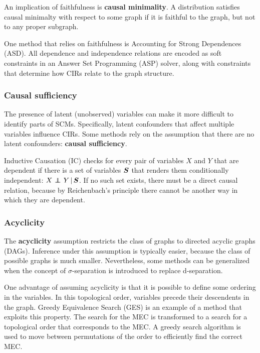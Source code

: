
An implication of faithfulness is \textbf{causal minimality}. A distribution satisfies causal minimalty with respect to some graph if it is faithful to the graph, but not to any proper subgraph. 

One method that relies on faithfulness is Accounting for Strong Dependences (ASD). All dependence and independence relations are encoded as soft constraints in an Answer Set Programming (ASP) solver, along with constraints that determine how CIRs relate to the graph structure.

\subsubsection{Causal sufficiency}

The presence of latent (unobserved) variables can make it more difficult to identify parts of SCMs. Specifically, latent confounders that affect multiple variables influence CIRs. Some methods rely on the assumption that there are no latent confounders: \textbf{causal sufficiency}.

Inductive Causation (IC) checks for every pair of variables $X$ and $Y$ that are dependent if there is a set of variables $\bm{S}$ that renders them conditionally independent: ${X} \operatorname*{{\,\perp\mkern-12mu\perp\,}}_{} {Y} \,|\, {\bm{S}}$. If no such set exists, there must be a direct causal relation, because by Reichenbach's principle there cannot be another way in which they are dependent.

\subsubsection{Acyclicity}

The \textbf{acyclicity} assumption restricts the class of graphs to directed acyclic graphs (DAGs). Inference under this assumption is typically easier, because the class of possible graphs is much smaller. Nevertheless, some methods can be generalized when the concept of $\sigma$-separation is introduced to replace d-separation. 

One advantage of assuming acyclicity is that it is possible to define some ordering in the variables. In this topological order, variables precede their descendents in the graph. Greedy Equivalence Search (GES) is an example of a method that exploits this property. The search for the MEC is transformed to a search for a topological order that corresponds to the MEC. A greedy search algorithm is used to move between permutations of the order to efficiently find the correct MEC. 

